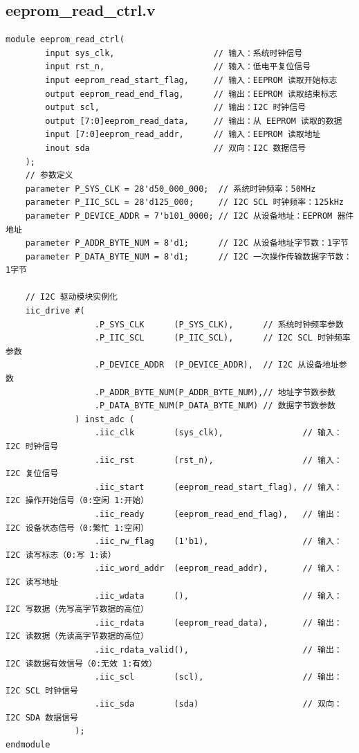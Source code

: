 \documentclass[a4paper,10pt]{article}
\begin{document}
\subsection{eeprom_read_ctrl.v}
\begin{lstlisting}[caption=eeprom_read_ctrl.v]
module eeprom_read_ctrl(
        input sys_clk,                    // 输入：系统时钟信号
        input rst_n,                      // 输入：低电平复位信号
        input eeprom_read_start_flag,     // 输入：EEPROM 读取开始标志
        output eeprom_read_end_flag,      // 输出：EEPROM 读取结束标志
        output scl,                       // 输出：I2C 时钟信号
        output [7:0]eeprom_read_data,     // 输出：从 EEPROM 读取的数据
        input [7:0]eeprom_read_addr,      // 输入：EEPROM 读取地址
        inout sda                         // 双向：I2C 数据信号
    );
    // 参数定义
    parameter P_SYS_CLK = 28'd50_000_000;  // 系统时钟频率：50MHz
    parameter P_IIC_SCL = 28'd125_000;     // I2C SCL 时钟频率：125kHz
    parameter P_DEVICE_ADDR = 7'b101_0000; // I2C 从设备地址：EEPROM 器件地址
    parameter P_ADDR_BYTE_NUM = 8'd1;      // I2C 从设备地址字节数：1字节
    parameter P_DATA_BYTE_NUM = 8'd1;      // I2C 一次操作传输数据字节数：1字节

    // I2C 驱动模块实例化
    iic_drive #(
                  .P_SYS_CLK      (P_SYS_CLK),      // 系统时钟频率参数
                  .P_IIC_SCL      (P_IIC_SCL),      // I2C SCL 时钟频率参数
                  .P_DEVICE_ADDR  (P_DEVICE_ADDR),  // I2C 从设备地址参数
                  .P_ADDR_BYTE_NUM(P_ADDR_BYTE_NUM),// 地址字节数参数
                  .P_DATA_BYTE_NUM(P_DATA_BYTE_NUM) // 数据字节数参数
              ) inst_adc (
                  .iic_clk        (sys_clk),                // 输入：I2C 时钟信号
                  .iic_rst        (rst_n),                  // 输入：I2C 复位信号
                  .iic_start      (eeprom_read_start_flag), // 输入：I2C 操作开始信号（0:空闲 1:开始）
                  .iic_ready      (eeprom_read_end_flag),   // 输出：I2C 设备状态信号（0:繁忙 1:空闲）
                  .iic_rw_flag    (1'b1),                   // 输入：I2C 读写标志（0:写 1:读）
                  .iic_word_addr  (eeprom_read_addr),       // 输入：I2C 读写地址
                  .iic_wdata      (),                       // 输入：I2C 写数据（先写高字节数据的高位）
                  .iic_rdata      (eeprom_read_data),       // 输出：I2C 读数据（先读高字节数据的高位）
                  .iic_rdata_valid(),                       // 输出：I2C 读数据有效信号（0:无效 1:有效）
                  .iic_scl        (scl),                    // 输出：I2C SCL 时钟信号
                  .iic_sda        (sda)                     // 双向：I2C SDA 数据信号
              );
endmodule

\end{lstlisting}
\end{document}
